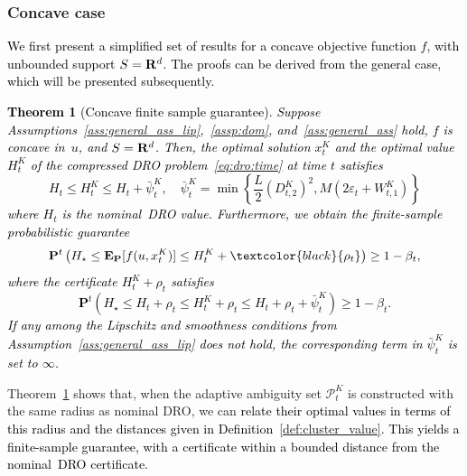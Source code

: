 \documentclass[12pt]{article}
\newcommand{\reals}{{\bf R}}
\newcommand{\prob}{{\mathbf P}}
\newcommand{\unc}{u}
\newcommand{\epsnom}{\varepsilon}
\newcommand{\ld}{W}
\newtheorem{theorem}{Theorem}[section]  %
\newcommand{\RC}[1]{\textcolor{black}{#1}}
\newcommand{\RC}[1]{\textcolor{blue}{#1}}
\begin{document}
\subsubsection{Concave case}
\label{sec:concave}
\RC{We first present a simplified set of results for a concave objective function $f$, with unbounded support $S = \reals^d$. The proofs can be derived from the general case, which will be presented subsequently.} 
\RC{\begin{theorem}[Concave finite sample guarantee] 
\label{thm:nominal_performance_concave}
Suppose Assumptions~\ref{ass:general_ass_lip},~\ref{assp:dom}, and~\ref{ass:general_ass} hold, $f$ is concave in~$u$, and $S = \reals^d$. Then, the optimal solution $x^K_t$ and the optimal value $H^K_t$ of the compressed \gls{DRO} problem~\eqref{eq:dro:time} at time $t$ satisfies
\begin{equation}
\label{eq:relate_concave}
 H_t \leq H_t^K \le H_t + \bar{\psi}_t^K, \quad \bar{\psi}_t^K = \min\left\{ {\frac{L}{2}}(D^K_{t,2})^2,  M(2\epsnom_{t} + \ld^K_{t,1})\right\}
\end{equation}
where $H_t$ is the nominal~\gls{DRO} value.
Furthermore, we obtain the finite-sample probabilistic guarantee
\begin{equation}
\label{eq:oos_bounds_concave}
\prob^{{t}}\left(H_\star \leq \mathbf{E}_{\mathbf{P}}[f(\unc, x^K_{t})] \leq H^K_t + \RC{\rho_{t}} \right) \geq 1 - \beta_{t},
\end{equation}
where the certificate $H^K_t + \rho_{t}$ satisfies
\begin{equation}
\label{eq:is_bounds_concave}
\prob^{{t}}\left( H_\star \leq H_{t} + \rho_{t}\leq  H^K_t  + \rho_{t} \leq H_{t}+  \rho_{t} +\bar{\psi}_t^K \right) \geq 1 - \beta_{t}.
\end{equation}
\RC{If any among the Lipschitz and smoothness conditions from Assumption~\ref{ass:general_ass_lip} does not hold, the corresponding term in $\bar{\psi}_t^K$ is set to $\infty$.}  
\end{theorem}}
Theorem~\ref{thm:nominal_performance_concave} shows that, when the adaptive ambiguity set $\mathcal{P}^K_{t}$ is constructed with the same radius as nominal \gls{DRO}, we can \RC{relate their optimal values in terms of this radius and the distances given in Definition~\ref{def:cluster_value}. 
This yields a finite-sample guarantee, with a certificate within a bounded distance from the nominal~\gls{DRO} certificate.} 
\end{document}
